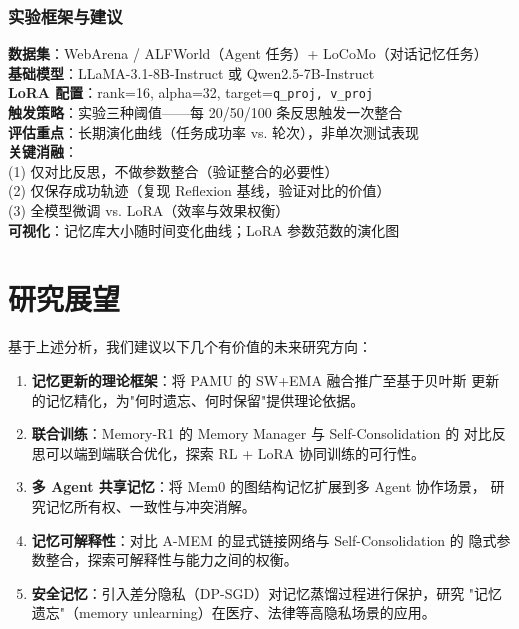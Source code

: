 \documentclass[11pt,a4paper]{article}
\begin{document}
\subsubsection{实验框架与建议}

\begin{insightbox}
\textbf{数据集}：WebArena / ALFWorld（Agent 任务）+ LoCoMo（对话记忆任务） \\
\textbf{基础模型}：LLaMA-3.1-8B-Instruct 或 Qwen2.5-7B-Instruct \\
\textbf{LoRA 配置}：rank=16, alpha=32, target=\texttt{q\_proj, v\_proj} \\
\textbf{触发策略}：实验三种阈值——每 20/50/100 条反思触发一次整合 \\
\textbf{评估重点}：长期演化曲线（任务成功率 vs. 轮次），非单次测试表现 \\
\textbf{关键消融}：\\
  \quad (1) 仅对比反思，不做参数整合（验证整合的必要性）\\
  \quad (2) 仅保存成功轨迹（复现 Reflexion 基线，验证对比的价值）\\
  \quad (3) 全模型微调 vs. LoRA（效率与效果权衡）\\
\textbf{可视化}：记忆库大小随时间变化曲线；LoRA 参数范数的演化图
\end{insightbox}

\section{研究展望}

基于上述分析，我们建议以下几个有价值的未来研究方向：

\begin{enumerate}
  \item \textbf{记忆更新的理论框架}：将 PAMU 的 SW+EMA 融合推广至基于贝叶斯
    更新的记忆精化，为"何时遗忘、何时保留"提供理论依据。

  \item \textbf{联合训练}：Memory-R1 的 Memory Manager 与 Self-Consolidation 的
    对比反思可以端到端联合优化，探索 RL + LoRA 协同训练的可行性。

  \item \textbf{多 Agent 共享记忆}：将 Mem0 的图结构记忆扩展到多 Agent 协作场景，
    研究记忆所有权、一致性与冲突消解。

  \item \textbf{记忆可解释性}：对比 A-MEM 的显式链接网络与 Self-Consolidation 的
    隐式参数整合，探索可解释性与能力之间的权衡。

  \item \textbf{安全记忆}：引入差分隐私（DP-SGD）对记忆蒸馏过程进行保护，研究
    "记忆遗忘"（memory unlearning）在医疗、法律等高隐私场景的应用。
\end{enumerate}
\end{document}
